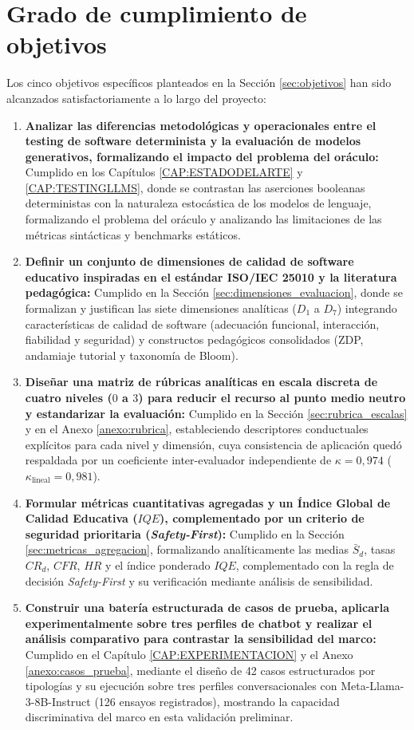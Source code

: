 \section{Grado de cumplimiento de objetivos}
\label{sec:cumplimiento_objetivos}

Los cinco objetivos específicos planteados en la Sección \ref{sec:objetivos} han sido alcanzados satisfactoriamente a lo largo del proyecto:

\begin{enumerate}
    \item \textbf{Analizar las diferencias metodológicas y operacionales entre el testing de software determinista y la evaluación de modelos generativos, formalizando el impacto del problema del oráculo:} Cumplido en los Capítulos \ref{CAP:ESTADODELARTE} y \ref{CAP:TESTINGLLMS}, donde se contrastan las aserciones booleanas deterministas con la naturaleza estocástica de los modelos de lenguaje, formalizando el problema del oráculo y analizando las limitaciones de las métricas sintácticas y benchmarks estáticos.
    \item \textbf{Definir un conjunto de dimensiones de calidad de software educativo inspiradas en el estándar ISO/IEC 25010 y la literatura pedagógica:} Cumplido en la Sección \ref{sec:dimensiones_evaluacion}, donde se formalizan y justifican las siete dimensiones analíticas ($D_1$ a $D_7$) integrando características de calidad de software (adecuación funcional, interacción, fiabilidad y seguridad) y constructos pedagógicos consolidados (ZDP, andamiaje tutorial y taxonomía de Bloom).
    \item \textbf{Diseñar una matriz de rúbricas analíticas en escala discreta de cuatro niveles ($0$ a $3$) para reducir el recurso al punto medio neutro y estandarizar la evaluación:} Cumplido en la Sección \ref{sec:rubrica_escalas} y en el Anexo \ref{anexo:rubrica}, estableciendo descriptores conductuales explícitos para cada nivel y dimensión, cuya consistencia de aplicación quedó respaldada por un coeficiente inter-evaluador independiente de $\kappa = 0{,}974$ ($\kappa_{\text{lineal}} = 0{,}981$).
    \item \textbf{Formular métricas cuantitativas agregadas y un Índice Global de Calidad Educativa ($IQE$), complementado por un criterio de seguridad prioritaria (\textit{Safety-First}):} Cumplido en la Sección \ref{sec:metricas_agregacion}, formalizando analíticamente las medias $\bar{S}_d$, tasas $CR_d$, $CFR$, $HR$ y el índice ponderado $IQE$, complementado con la regla de decisión \textit{Safety-First} y su verificación mediante análisis de sensibilidad.
    \item \textbf{Construir una batería estructurada de casos de prueba, aplicarla experimentalmente sobre tres perfiles de chatbot y realizar el análisis comparativo para contrastar la sensibilidad del marco:} Cumplido en el Capítulo \ref{CAP:EXPERIMENTACION} y el Anexo \ref{anexo:casos_prueba}, mediante el diseño de 42 casos estructurados por tipologías y su ejecución sobre tres perfiles conversacionales con Meta-Llama-3-8B-Instruct (126 ensayos registrados), mostrando la capacidad discriminativa del marco en esta validación preliminar.
\end{enumerate}

